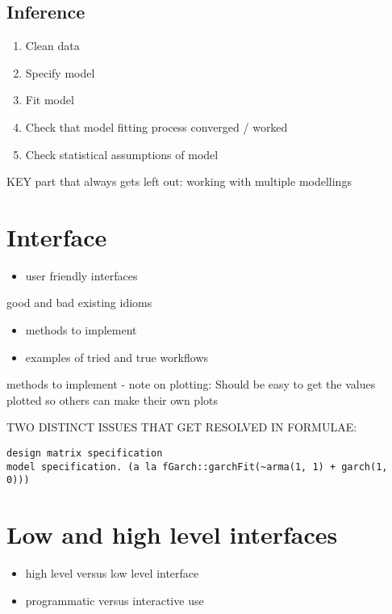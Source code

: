 \documentclass[]{book}
\providecommand{\tightlist}{%
  \setlength{\itemsep}{0pt}\setlength{\parskip}{0pt}}
\theoremstyle{definition}
\theoremstyle{definition}
\theoremstyle{definition}
\theoremstyle{remark}
\begin{document}
\section{Inference}\label{inference}

\begin{enumerate}
\def\labelenumi{\arabic{enumi}.}
\tightlist
\item
  Clean data
\item
  Specify model
\item
  Fit model
\item
  Check that model fitting process converged / worked
\item
  Check statistical assumptions of model
\end{enumerate}

KEY part that always gets left out: working with multiple modellings

\chapter{Interface}\label{interface}

\begin{itemize}
\tightlist
\item
  user friendly interfaces
\end{itemize}

good and bad existing idioms

\begin{itemize}
\tightlist
\item
  methods to implement
\item
  examples of tried and true workflows
\end{itemize}

methods to implement - note on plotting: Should be easy to get the
values plotted so others can make their own plots

TWO DISTINCT ISSUES THAT GET RESOLVED IN FORMULAE:

\begin{verbatim}
design matrix specification
model specification. (a la fGarch::garchFit(~arma(1, 1) + garch(1, 0)))
\end{verbatim}

\chapter{Low and high level
interfaces}\label{low-and-high-level-interfaces}

\begin{itemize}
\tightlist
\item
  high level versus low level interface
\item
  programmatic versus interactive use
\end{itemize}
\end{document}
